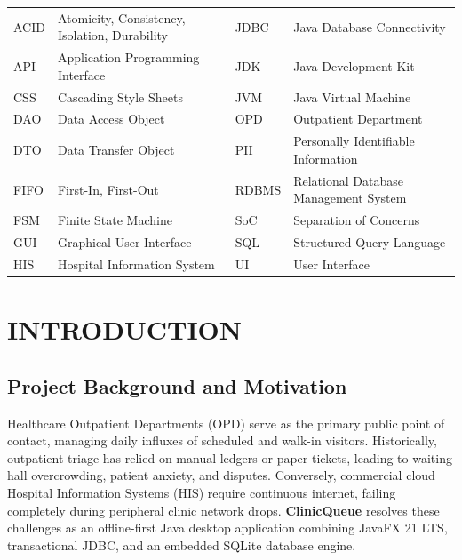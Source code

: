 \documentclass[12pt,a4paper,oneside]{report}
\begin{document}
\noindent
\small
\begin{tabularx}{\textwidth}{p{2.2cm} X p{2.2cm} X}
ACID & Atomicity, Consistency, Isolation, Durability & JDBC & Java Database Connectivity \\
API & Application Programming Interface & JDK & Java Development Kit \\
CSS & Cascading Style Sheets & JVM & Java Virtual Machine \\
DAO & Data Access Object & OPD & Outpatient Department \\
DTO & Data Transfer Object & PII & Personally Identifiable Information \\
FIFO & First-In, First-Out & RDBMS & Relational Database Management System \\
FSM & Finite State Machine & SoC & Separation of Concerns \\
GUI & Graphical User Interface & SQL & Structured Query Language \\
HIS & Hospital Information System & UI & User Interface \\
\end{tabularx}

\newpage
{}
\setcounter{page}{1}

\chapter{INTRODUCTION}

\section{Project Background and Motivation}
Healthcare Outpatient Departments (OPD) serve as the primary public point of contact, managing daily influxes of scheduled and walk-in visitors. Historically, outpatient triage has relied on manual ledgers or paper tickets, leading to waiting hall overcrowding, patient anxiety, and disputes. Conversely, commercial cloud Hospital Information Systems (HIS) require continuous internet, failing completely during peripheral clinic network drops. \textbf{ClinicQueue} resolves these challenges as an offline-first Java desktop application combining JavaFX 21 LTS, transactional JDBC, and an embedded SQLite database engine.
\end{document}
